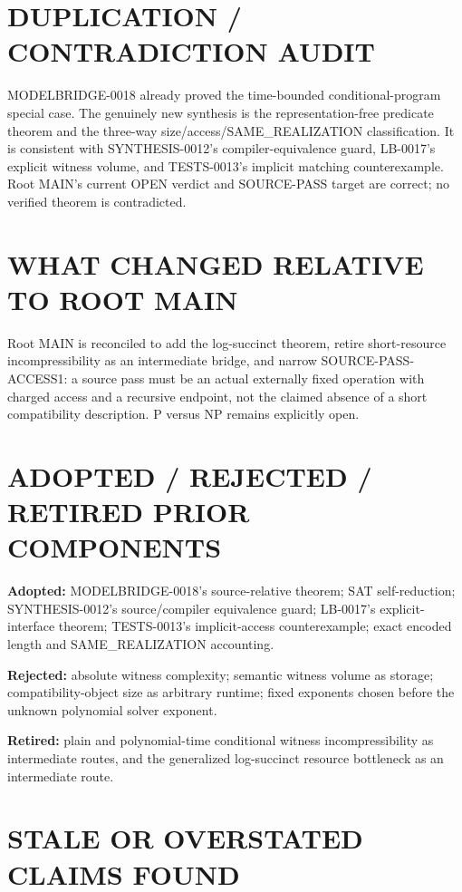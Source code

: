 \documentclass[11pt]{article}
\begin{document}
\section{DUPLICATION / CONTRADICTION AUDIT}

MODELBRIDGE-0018 already proved the time-bounded conditional-program special case.  The genuinely new synthesis is the representation-free predicate theorem and the three-way size/access/SAME\_REALIZATION classification.  It is consistent with SYNTHESIS-0012's compiler-equivalence guard, LB-0017's explicit witness volume, and TESTS-0013's implicit matching counterexample.  Root MAIN's current OPEN verdict and SOURCE-PASS target are correct; no verified theorem is contradicted.

\section{WHAT CHANGED RELATIVE TO ROOT MAIN}

Root MAIN is reconciled to add the log-succinct theorem, retire short-resource incompressibility as an intermediate bridge, and narrow SOURCE-PASS-ACCESS1: a source pass must be an actual externally fixed operation with charged access and a recursive endpoint, not the claimed absence of a short compatibility description.  P versus NP remains explicitly open.

\section{ADOPTED / REJECTED / RETIRED PRIOR COMPONENTS}

\textbf{Adopted:} MODELBRIDGE-0018's source-relative theorem; SAT self-reduction; SYNTHESIS-0012's source/compiler equivalence guard; LB-0017's explicit-interface theorem; TESTS-0013's implicit-access counterexample; exact encoded length and SAME\_REALIZATION accounting.

\textbf{Rejected:} absolute witness complexity; semantic witness volume as storage; compatibility-object size as arbitrary runtime; fixed exponents chosen before the unknown polynomial solver exponent.

\textbf{Retired:} plain and polynomial-time conditional witness incompressibility as intermediate routes, and the generalized log-succinct resource bottleneck as an intermediate route.

\section{STALE OR OVERSTATED CLAIMS FOUND}
\end{document}
